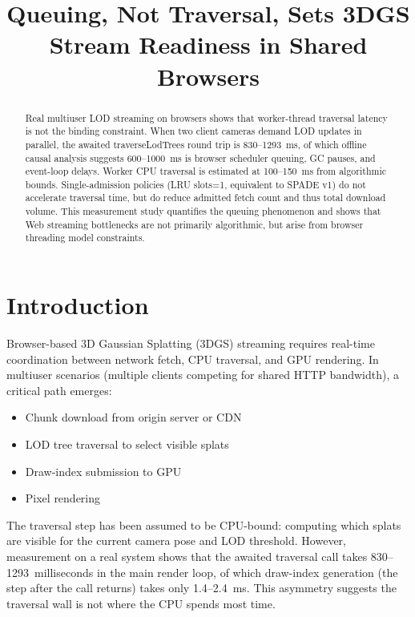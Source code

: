 \documentclass[sigconf,anonymous,review]{acmart}
\begin{document}
\title{Queuing, Not Traversal, Sets 3DGS Stream Readiness in Shared Browsers}

\begin{abstract}
Real multiuser LOD streaming on browsers shows that worker-thread traversal latency is not the binding constraint. When two client cameras demand LOD updates in parallel, the awaited traverseLodTrees round trip is 830--1293~ms, of which offline causal analysis suggests 600--1000~ms is browser scheduler queuing, GC pauses, and event-loop delays. Worker CPU traversal is estimated at 100--150~ms from algorithmic bounds. Single-admission policies (LRU slots=1, equivalent to SPADE v1) do not accelerate traversal time, but do reduce admitted fetch count and thus total download volume. This measurement study quantifies the queuing phenomenon and shows that Web streaming bottlenecks are not primarily algorithmic, but arise from browser threading model constraints.
\end{abstract}

\maketitle

\section{Introduction}

Browser-based 3D Gaussian Splatting (3DGS) streaming requires real-time coordination between network fetch, CPU traversal, and GPU rendering. In multiuser scenarios (multiple clients competing for shared HTTP bandwidth), a critical path emerges:
\begin{itemize}
  \item Chunk download from origin server or CDN
  \item LOD tree traversal to select visible splats
  \item Draw-index submission to GPU
  \item Pixel rendering
\end{itemize}

The traversal step has been assumed to be CPU-bound: computing which splats are visible for the current camera pose and LOD threshold. However, measurement on a real system shows that the awaited traversal call takes 830--1293~milliseconds in the main render loop, of which draw-index generation (the step after the call returns) takes only 1.4--2.4~ms. This asymmetry suggests the traversal wall is not where the CPU spends most time.
\end{document}
